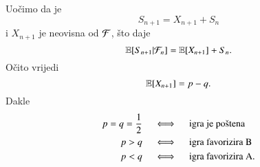 \begin{pr}
    Uo\v cimo da je
    \begin{equation*}
        S_{n + 1} = X_{n + 1} + S_n
    \end{equation*}
    i $X_{n + 1}$ je neovisna od $\mathcal{F}$, \v sto daje
    \begin{equation*}
        \mathbb{E} [S_{n + 1} | \mathcal{F}_n] = \mathbb{E} [X_{n + 1}] + S_n.
    \end{equation*}
    O\v cito vrijedi
    \begin{equation*}
        \mathbb{E} [X_{n + 1}] = p - q.
    \end{equation*}
    Dakle
    \begin{equation}    \label{jed:23.3}
        \begin{aligned}
            p = q = \frac{1}{2} \quad &\iff \quad \textnormal{igra je po\v stena}\\
            p > q \quad &\iff \quad \textnormal{igra favorizira B}\\
            p < q \quad &\iff \quad \textnormal{igra favorizira A}.
        \end{aligned}
    \end{equation}
\end{pr}